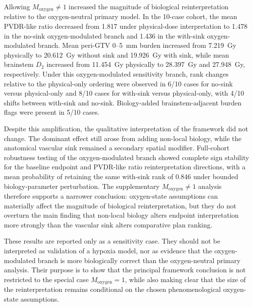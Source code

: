 \documentclass[10pt,a4paper]{article}
\begin{document}
Allowing $M_{\mathrm{oxygen}}\neq 1$ increased the magnitude of biological reinterpretation relative to the oxygen-neutral primary model. In the 10-case cohort, the mean PVDR-like ratio decreased from 1.817 under physical-dose interpretation to 1.478 in the no-sink oxygen-modulated branch and 1.436 in the with-sink oxygen-modulated branch. Mean peri-GTV 0--5~mm burden increased from 7.219~Gy physically to 20.612~Gy without sink and 19.926~Gy with sink, while mean brainstem $D_2$ increased from 11.454~Gy physically to 28.397~Gy and 27.948~Gy, respectively. Under this oxygen-modulated sensitivity branch, rank changes relative to the physical-only ordering were observed in 6/10 cases for no-sink versus physical-only and 8/10 cases for with-sink versus physical-only, with 4/10 shifts between with-sink and no-sink. Biology-added brainstem-adjacent burden flags were present in 5/10 cases.

Despite this amplification, the qualitative interpretation of the framework did not change. The dominant effect still arose from adding non-local biology, while the anatomical vascular sink remained a secondary spatial modifier. Full-cohort robustness testing of the oxygen-modulated branch showed complete sign stability for the baseline endpoint and PVDR-like ratio reinterpretation directions, with a mean probability of retaining the same with-sink rank of 0.846 under bounded biology-parameter perturbation. The supplementary $M_{\mathrm{oxygen}}\neq 1$ analysis therefore supports a narrower conclusion: oxygen-state assumptions can materially affect the magnitude of biological reinterpretation, but they do not overturn the main finding that non-local biology alters endpoint interpretation more strongly than the vascular sink alters comparative plan ranking.

These results are reported only as a sensitivity case. They should not be interpreted as validation of a hypoxia model, nor as evidence that the oxygen-modulated branch is more biologically correct than the oxygen-neutral primary analysis. Their purpose is to show that the principal framework conclusion is not restricted to the special case $M_{\mathrm{oxygen}}=1$, while also making clear that the size of the reinterpretation remains conditional on the chosen phenomenological oxygen-state assumptions.
\end{document}
